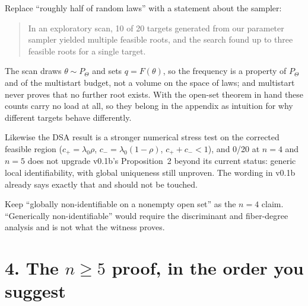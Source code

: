 \documentclass[11pt]{article}
\theoremstyle{remark}
\begin{document}
Replace ``roughly half of random laws'' with a statement about the sampler:

\begin{quote}
In an exploratory scan, 10 of 20 targets generated from our parameter sampler yielded multiple feasible roots, and the search found up to three feasible roots for a single target.
\end{quote}

The scan draws $\theta\sim P_\Theta$ and sets $q=F(\theta)$, so the frequency is a property of $P_\Theta$ and of the multistart budget, not a volume on the space of laws; and multistart never proves that no further root exists. With the open-set theorem in hand these counts carry no load at all, so they belong in the appendix as intuition for why different targets behave differently.

Likewise the DSA result is a stronger numerical stress test on the corrected feasible region ($c_+=\lambda_0\rho$, $c_-=\lambda_0(1-\rho)$, $c_++c_-<1$), and 0/20 at $n=4$ and $n=5$ does not upgrade v0.1b's Proposition~2 beyond its current status: generic local identifiability, with global uniqueness still unproven. The wording in v0.1b already says exactly that and should not be touched.

Keep ``globally non-identifiable on a nonempty open set'' as the $n=4$ claim. ``Generically non-identifiable'' would require the discriminant and fiber-degree analysis and is not what the witness proves.

\section*{4. The $n\ge5$ proof, in the order you suggest}
\end{document}
